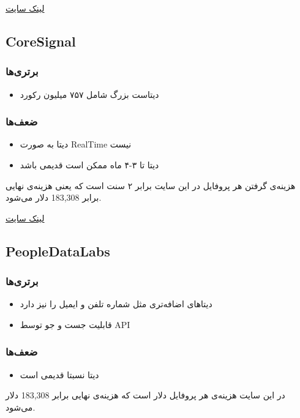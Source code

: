 \href{https://brightdata.com/}{لینک سایت}



\subsection{CoreSignal}

\subsubsection{برتری‌ها}
\begin{itemize}
    \item دیتاست بزرگ شامل ۷۵۷ میلیون رکورد
\end{itemize}
\subsubsection{ضعف‌ها}
\begin{itemize}
    \item دیتا به صورت RealTime نیست
    \item دیتا تا ۳-۴ ماه ممکن است قدیمی باشد
\end{itemize}

هزینه‌ی گرفتن هر پروفایل در این سایت برابر ۲ سنت است که یعنی هزینه‌ی نهایی برابر 183,308 دلار می‌شود.


\href{https://coresignal.com/}{لینک سایت}

\subsection{PeopleDataLabs}

\subsubsection{برتری‌ها}
\begin{itemize}
    \item دیتاهای اضافه‌تری مثل شماره تلفن و ایمیل را نیز دارد
    \item قابلیت جست و جو توسط API
\end{itemize}
\subsubsection{ضعف‌ها}
\begin{itemize}
    \item دیتا نسبتا قدیمی است
\end{itemize}

در این سایت هزینه‌ی هر پروفایل  دلار است که هزینه‌ی نهایی برابر 183,308 دلار می‌شود.

